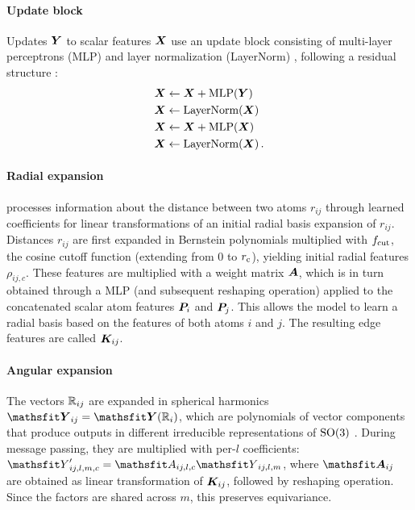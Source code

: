 \documentclass[10pt]{article} %
\begin{document}
\paragraph{Update block} Updates ${\bm{Y}}$ to scalar features ${\bm{X}}$ use an update block consisting of multi-layer perceptrons (MLP) and layer normalization (LayerNorm) \citep{bkh2016}, following a residual structure \citep{hzrs2015}:
\begin{align}
  {\bm{X}} &\leftarrow {\bm{X}} + \text{MLP}({\bm{Y}}) \nonumber\\
  {\bm{X}} &\leftarrow \text{LayerNorm}({\bm{X}}) \nonumber\\
  {\bm{X}} &\leftarrow {\bm{X}} + \text{MLP}({\bm{X}}) \nonumber\\
  {\bm{X}} &\leftarrow \text{LayerNorm}({\bm{X}}) \nonumber \, .
\end{align}

\paragraph{Radial expansion} \lorem processes information about the distance between two atoms $r_{ij}$ through learned coefficients for linear transformations of an initial radial basis expansion of $r_{ij}$. Distances $r_{ij}$ are first expanded in Bernstein polynomials multiplied with $f_{\text{cut}}$, the cosine cutoff function (extending from $0$ to $r_{\text{c}}$), yielding initial radial features $\rho_{ij,c}$. These features are multiplied with a weight matrix ${\bm{A}}$, which is in turn obtained through a MLP (and subsequent reshaping operation) applied to the concatenated scalar atom features ${\bm{P}}_i$ and ${\bm{P}}_j$. This allows the model to learn a radial basis based on the features of both atoms $i$ and $j$. The resulting edge features are called ${\bm{K}}_{ij}$.

\paragraph{Angular expansion} The vectors $\mathbb{R}_{ij}$ are expanded in spherical harmonics $\tY_{ij}=\tY(\R_i)$, which are polynomials of vector components that produce outputs in different irreducible representations of $\text{SO}(3)$ \citep{um2024}. During message passing, they are multiplied with per-$l$ coefficients: $\etY'_{ij,l,m,c} = \etA_{ij,l,c} \etY_{ij,l,m}$, where $\tA_{ij}$ are obtained as linear transformation of ${\bm{K}}_{ij}$, followed by reshaping operation. Since the factors are shared across $m$, this preserves equivariance.
\end{document}
